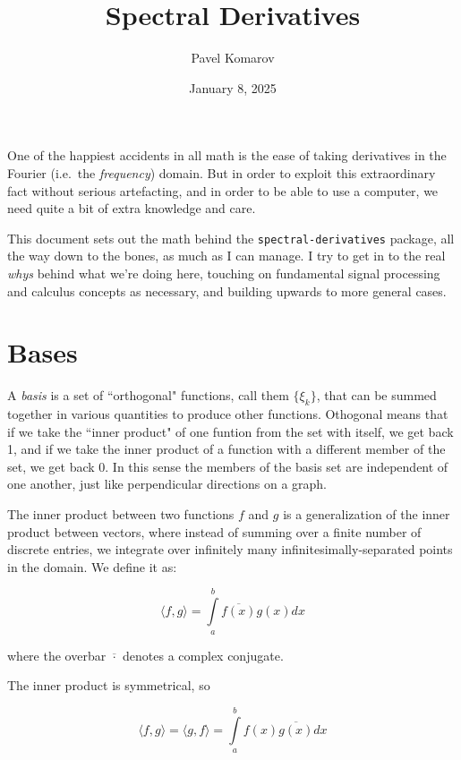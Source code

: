 \documentclass[10pt]{article}
\begin{document}
\allowdisplaybreaks

\title{Spectral Derivatives}
\author{Pavel Komarov}
\date{January 8, 2025}
\maketitle

One of the happiest accidents in all math is the ease of taking derivatives in the Fourier (i.e.~the \textit{frequency}) domain. But in order to exploit this extraordinary fact without serious artefacting, and in order to be able to use a computer, we need quite a bit of extra knowledge and care.

This document sets out the math behind the \texttt{spectral-derivatives} package, all the way down to the bones, as much as I can manage. I try to get in to the real \textit{whys} behind what we're doing here, touching on fundamental signal processing and calculus concepts as necessary, and building upwards to more general cases.

\tableofcontents
\pagebreak

\section{Bases}

A \textit{basis} is a set of ``orthogonal" functions, call them $\{\xi_k\}$, that can be summed together in various quantities to produce other functions. Othogonal means that if we take the ``inner product" of one funtion from the set with itself, we get back 1, and if we take the inner product of a function with a different member of the set, we get back 0. In this sense the members of the basis set are independent of one another, just like perpendicular directions on a graph.

The inner product between two functions $f$ and $g$ is a generalization of the inner product between vectors, where instead of summing over a finite number of discrete entries, we integrate over infinitely many infinitesimally-separated points in the domain. We define it as:

$$ \langle f,g \rangle = \int\limits_{a}^{b} \overline{f(x)} g(x) dx $$

where the overbar $\overline{\cdot}$ denotes a complex conjugate.\newline

The inner product is symmetrical, so

$$ \langle f,g \rangle = \langle g,f \rangle = \int\limits_{a}^{b} f(x) \overline{g(x)} dx $$
\end{document}
